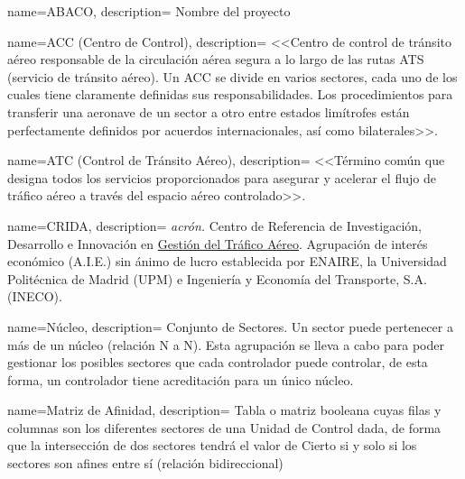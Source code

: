 \makeglossaries

%
%
%        
%
%



{
    name={ABACO},
    description=
    {
        Nombre del proyecto
    }
}

{
    name={ACC (Centro de Control)},
    description=
    {
        <<Centro de control de tránsito aéreo responsable de la circulación aérea segura a lo largo de las rutas ATS 
        (servicio de tránsito aéreo). Un ACC se divide en varios sectores, cada uno de los cuales tiene claramente 
        definidas sus responsabilidades. Los procedimientos para transferir una aeronave de un sector a otro entre 
        estados limítrofes están perfectamente definidos por acuerdos internacionales, así como 
        bilaterales>>.~\cite{ENAIRE-web}
    }
}

{
    name={ATC (Control de Tránsito Aéreo)},
    description=
    {   
        <<Término común que designa todos los servicios proporcionados para asegurar y acelerar el flujo de tráfico 
        aéreo a través del espacio aéreo controlado>>.~\cite{ENAIRE-web}
    }
}

{
    name={CRIDA},
    description=
    {   
        \textit{acrón.} Centro de Referencia de Investigación, Desarrollo e Innovación 
        en \hyperref[ATC]{Gestión del Tráfico Aéreo}. Agrupación de interés económico (A.I.E.) sin ánimo de lucro 
        establecida por ENAIRE, la Universidad Politécnica de Madrid (UPM) e Ingeniería y Economía del Transporte, S.A. 
        (INECO).~\cite{CRIDA-web}
    }
}

{
    name={Núcleo},
    description=
    {   
        Conjunto de Sectores. Un sector puede pertenecer a más de un núcleo (relación N a N). Esta 
        agrupación se lleva a cabo para poder gestionar los posibles sectores que cada controlador puede controlar, de 
        esta 
        forma, un controlador tiene acreditación para un único núcleo.
    }
}

{
    name={Matriz de Afinidad},
    description=
    {   
        Tabla o matriz booleana cuyas filas y columnas son los diferentes sectores de 
        una Unidad de Control dada, de forma que la intersección de dos sectores tendrá el valor de Cierto si y solo si 
        los sectores son afines entre sí (relación bidireccional)
    }
}

